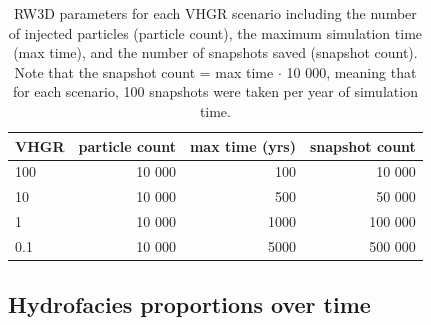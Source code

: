 

\bgroup

\renewcommand{\arraystretch}{1.5}

\setlength{\tabcolsep}{20pt}

\begin{table}[H]

\caption{RW3D parameters for each VHGR scenario including the number of injected particles (particle count), the maximum simulation time (max time), and the number of snapshots saved (snapshot count). Note that the snapshot count = max time $\cdot$ 10 000, meaning that for each scenario, 100 snapshots were taken per year of simulation time.} 
\centering

\begin{tabular}{lrrr}
\label{ap_c_rw3d_params}

\textbf{VHGR} & \textbf{particle count} & \textbf{max time (yrs)} & \textbf{snapshot count}  \\ 
\hline
   100 & 10 000  & 100   & 10 000  \\
   10  & 10 000  & 500   & 50 000  \\
   1   & 10 000  & 1000 & 100 000 \\
   0.1 & 10 000  & 5000 & 500 000 \\
\hline
\end{tabular}

\end{table}
\egroup








\subsection{Hydrofacies proportions over time}



